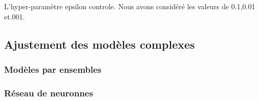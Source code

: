 L'hyper-paramètre epsilon controle. Nous avons considéré les valeurs de 0.1,0.01 et.001. 


\subsection{Ajustement des modèles complexes}

\subsubsection{Modèles par ensembles}

\subsubsection{Réseau de neuronnes}

